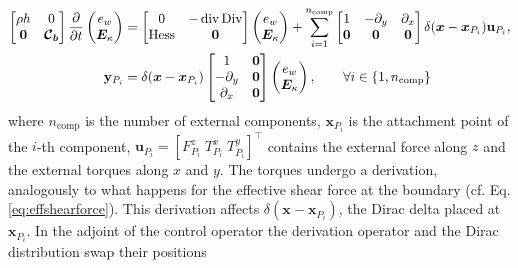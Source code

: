 \begin{equation}
\begin{aligned}
\begin{bmatrix}
\rho h & 0 \\ 
\bm{0} & \bm{\mathcal{C}_b} \\
\end{bmatrix}
\diffp{}{t}
\begin{pmatrix}
e_w \\ \bm{E}_\kappa \\
\end{pmatrix} &= 
\begin{bmatrix}
0 & -\div\Div \\ 
\Hess & \bm{0} \\
\end{bmatrix}
\begin{pmatrix}
e_w \\ \bm{E}_\kappa \\
\end{pmatrix} + 
\sum_{i = 1}^{n_{\mathrm{comp}}} 
\begin{bmatrix}
1 & -\partial_y & \partial_x \\
\bm{0} & \bm{0} & \bm{0} \\
\end{bmatrix} \delta(\bm{x} - \bm{x}_{P_i}) \mathbf{u}_{P_i}, \\
\mathbf{y}_{P_i} &= \delta(\bm{x} - \bm{x}_{P_i}) \begin{bmatrix}
1 & \bm{0} \\
-\partial_y & \bm{0} \\
\partial_x & \bm{0} \\
\end{bmatrix}  \begin{pmatrix}
e_w \\ \bm{E}_\kappa \\
\end{pmatrix}, \qquad \forall i \in \{1, n_{\mathrm{comp}}\}
\end{aligned}
\end{equation}
where $n_{\mathrm{comp}}$ is the number of external components, $\bm{x}_{P_i}$ is the attachment point of the $i$-th component, $\mathbf{u}_{P_i} = [F_{P_i}^z \; T_{P_i}^x \; T_{P_i}^y]^\top$ contains the external force along $z$ and the external torques along $x$ and $y$. The torques undergo a derivation, analogously to what happens for the effective shear force at the boundary (cf. Eq. \eqref{eq:effshearforce}). This derivation affects  $\delta(\bm{x} - \bm{x}_{P_i})$, the Dirac delta placed at $\bm{x}_{P_i}$. In the adjoint of the control operator the derivation operator and the Dirac distribution swap their positions
